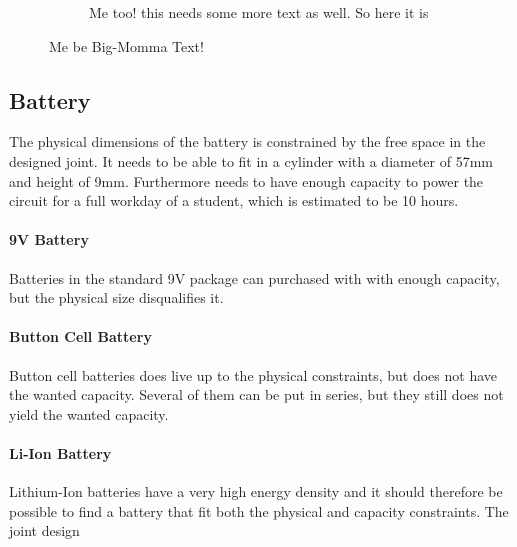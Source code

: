 \begin{figure}[H]
\begin{minipage}{.4\linewidth}
\begin{subfigure}[b]{\linewidth}
			\caption{Me too! this needs some more text as well. So here it is}
			\label{sfig:readside_2}
		\end{subfigure}
	\end{minipage}
	\caption{Me be Big-Momma Text!}
	\label{fig:mechdesign}
\end{figure}
\subsection{Battery}
\label{subsub:battery}
The physical dimensions of the battery is constrained by the free space in the designed joint.
It needs to be able to fit in a cylinder with a diameter of 57mm and height of 9mm.
Furthermore needs to have enough capacity to power the circuit for a full workday of a student, which is estimated to be 10 hours.

\paragraph{9V Battery}
Batteries in the standard 9V package can purchased with with enough capacity, but the physical size disqualifies it.

\paragraph{Button Cell Battery}
Button cell batteries does live up to the physical constraints, but does not have the wanted capacity. 
Several of them can be put in series, but they still does not yield the wanted capacity.

\paragraph{Li-Ion Battery}
Lithium-Ion batteries have a very high energy density and it should therefore be possible to find a battery that fit both the physical and capacity constraints.
The joint design


